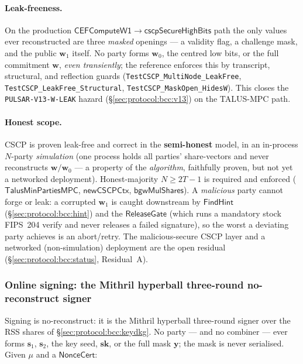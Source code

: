 \paragraph{Leak-freeness.} On the production
$\mathsf{CEFComputeW1} \to \mathsf{cscpSecureHighBits}$ path the only values
ever reconstructed are three \emph{masked} openings --- a validity flag, a
challenge mask, and the public $\mathbf{w}_1$ itself. No party forms
$\mathbf{w}_0$, the centred low bits, or the full commitment $\mathbf{w}$,
\emph{even transiently}; the reference enforces this by transcript,
structural, and reflection guards (\texttt{TestCSCP\_MultiNode\_LeakFree},
\texttt{TestCSCP\_LeakFree\_Structural}, \texttt{TestCSCP\_MaskOpen\_HidesW}).
This closes the \texttt{PULSAR-V13-W-LEAK} hazard
(\S\ref{sec:protocol:bcc:v13}) on the TALUS-MPC path.

\paragraph{Honest scope.} CSCP is proven leak-free and correct in the
\textbf{semi-honest} model, in an in-process $N$-party \emph{simulation}
(one process holds all parties' share-vectors and never reconstructs
$\mathbf{w}/\mathbf{w}_0$ --- a property of the \emph{algorithm}, faithfully
proven, but not yet a networked deployment). Honest-majority $N \geq 2T-1$
is required and enforced ($\mathsf{TalusMinPartiesMPC}$,
$\mathsf{newCSCPCtx}$, $\mathsf{bgwMulShares}$). A \emph{malicious} party
cannot forge or leak: a corrupted $\mathbf{w}_1$ is caught downstream by
$\mathsf{FindHint}$ (\S\ref{sec:protocol:bcc:hint}) and the
$\mathsf{ReleaseGate}$ (which runs a mandatory stock FIPS~204 verify and
never releases a failed signature), so the worst a deviating party
achieves is an abort/retry. The malicious-secure CSCP layer and a
networked (non-simulation) deployment are the open residual
(\S\ref{sec:protocol:bcc:status}, Residual~A).

\subsubsection{Online signing: the Mithril hyperball three-round no-reconstruct signer}
\label{sec:protocol:bcc:online}

Signing is no-reconstruct: it is the Mithril hyperball three-round signer
\cite{mithril2026} over the RSS shares of \S\ref{sec:protocol:bcc:keydkg}.
No party --- and no combiner --- ever forms $\mathbf{s}_1$, $\mathbf{s}_2$,
the key seed, $\mathbf{sk}$, or the full mask $\mathbf{y}$; the mask is
never serialised. Given $\mu$ and a $\mathsf{NonceCert}$:

